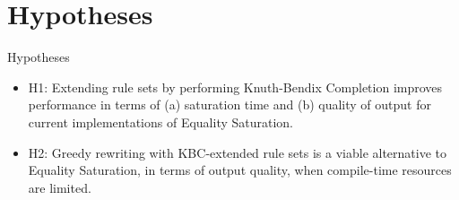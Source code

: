 \documentclass[14pt, aspectratio=169]{beamer}
\begin{document}
	\section{Hypotheses}
	\begin{frame}{Hypotheses}
		\begin{itemize}
			\item H1: Extending rule sets by performing Knuth-Bendix Completion improves performance in terms of
			(a) saturation time and (b) quality of output for current implementations of Equality Saturation.
			\item H2: Greedy rewriting with KBC-extended rule sets is a viable alternative to Equality Saturation, in terms of output quality, when
			compile-time resources are limited.
		\end{itemize}
	\end{frame}
\end{document}
